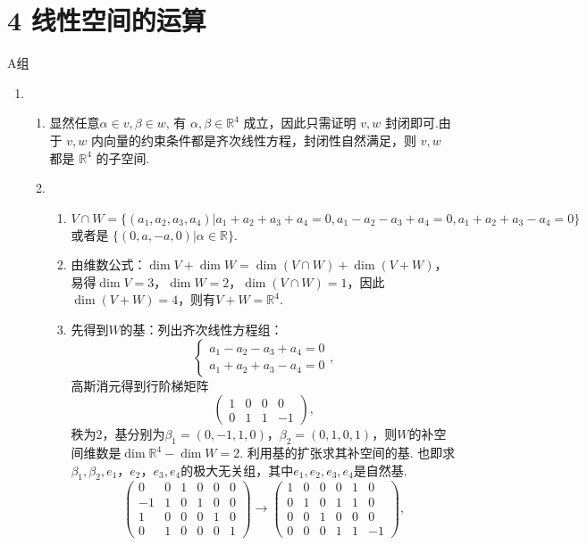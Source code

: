 \section*{4 线性空间的运算}

\vspace{2ex}

\centerline{\heiti A组}
\begin{enumerate}
    \item \begin{enumerate}
        \item 显然任意$\alpha\in v,\beta \in w$, 有 $\alpha,\beta\in \mathbb R^4$ 成立，因此只需证明 $v,w$ 封闭即可.由于 $v,w$ 内向量的约束条件都是齐次线性方程，封闭性自然满足，则 $v,w$ 都是 $\mathbb R^4$ 的子空间.
        \item \begin{enumerate}
            \item $V\cap W=\{(a_1,a_2,a_3,a_4)|a_1+a_2+a_3+a_4=0,a_1-a_2-a_3+a_4=0,a_1+a_2+a_3-a_4=0\}$ 或者是 $\{(0,a,-a,0)|\alpha\in \mathbb R\}$.
            \item 由维数公式：$\dim V+\dim W=\dim (V\cap W)+\dim (V+W)$，易得$\dim V=3，\dim W=2，\dim (V\cap W)=1$，因此$\dim (V+W)=4$，则有$V+W=\mathbb R^4$.
            \item 先得到$W$的基：列出齐次线性方程组：
            \[\begin{cases}a_1-a_2-a_3+a_4=0\\a_1+a_2+a_3-a_4=0\end{cases},\]
            高斯消元得到行阶梯矩阵
            \[\begin{pmatrix}1&0&0&0\\0&1&1&-1\end{pmatrix},\]
            秩为$2$，基分别为$\beta_1= (0,-1,1,0)$，$\beta_2= (0,1,0,1)$，则$W$的补空间维数是$\dim \mathbb R^4-\dim W=2$. 利用基的扩张求其补空间的基. 也即求$\beta_1,\beta_2,e_1，e_2，e_3,e_4$的极大无关组，其中$e_1,e_2,e_3,e_4$是自然基.
            \[\begin{pmatrix}0&0&1&0&0&0\\-1&1&0&1&0&0\\1&0&0&0&1&0\\0&1&0&0&0&1\end{pmatrix}\rightarrow\begin{pmatrix}1&0&0&0&1&0\\0&1&0&1&1&0\\0&0&1&0&0&0\\0&0&0&1&1&-1\end{pmatrix},\]

\end{enumerate}
\end{enumerate}
\end{enumerate}
